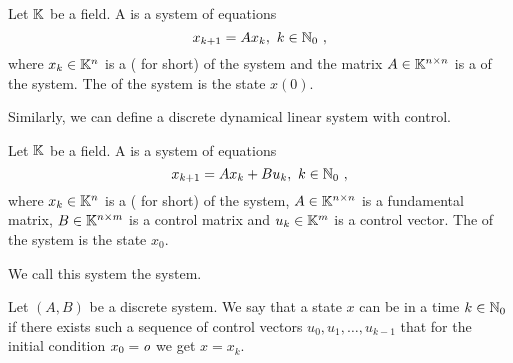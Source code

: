 \begin{definition}
	Let $\mathbb{K}$ be a field. A  is a system of equations
	$$x_{k+1}=Ax_k,\ k\in\N_0\ ,$$
	where $x_k\in \mathbb{K}^n$ is a  ( for short) of the system and the matrix $A\in \mathbb{K}^{n\times n}$ is a  of the system. The  of the system is the state $x(0)$.
\end{definition}

Similarly, we can define a discrete dynamical linear system with control.

\begin{definition}
	Let $\mathbb{K}$ be a field. A  is a system of equations
	$$x_{k+1}=Ax_k+Bu_k,\ k\in\N_0\ ,$$
	where $x_k\in\mathbb{K}^n$ is a  ( for short) of the system, $A\in\mathbb{K}^{n\times n}$ is a fundamental matrix, $B\in\mathbb{K}^{n\times m}$ is a control matrix and $u_k\in\mathbb{K}^m$ is a control vector. The  of the system is the state $x_0$.

	We call this system the  system.
\end{definition}

\begin{definition}
	Let $(A,B)$ be a discrete system. We say that a state $x$ can be  in a time $k\in\mathbb{N}_0$ if there exists such a sequence of control vectors $u_0,u_1,\ldots,u_{k-1}$ that for the initial condition $x_0=\textit{o}$ we get $x=x_k$.
\end{definition}

